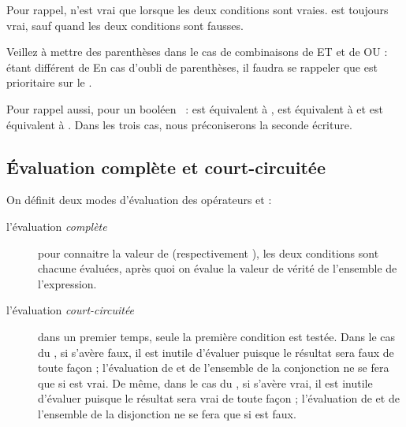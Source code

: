 			Pour rappel,  n’est vrai que lorsque
			les deux conditions sont vraies.  est
			toujours vrai, sauf quand les deux conditions sont fausses.
	
			Veillez à mettre des parenthèses dans le cas de combinaisons de ET et de
			OU :  étant différent de
			 En cas
			d'oubli de parenthèses, il faudra se rappeler que
			 est prioritaire sur le .
			
			Pour rappel aussi, pour un booléen ~: 
			 est équivalent à ,
			 est équivalent à  et 
			 est équivalent à .
			Dans les trois cas, nous préconiserons la seconde écriture.
	
		\subsection{Évaluation complète et court-circuitée}
	
			On définit deux modes d’évaluation des opérateurs 
			et  :
	
			\begin{description}
			\item[l’évaluation \textit{complète}]
				pour connaitre la valeur de
				 (respectivement
				), les deux conditions sont chacune
				évaluées, après quoi on évalue la valeur de vérité de l’ensemble de
				l'expression.
			\item[l’évaluation \textit{court-circuitée}]
				dans un premier temps, seule la
				première condition est testée. Dans le cas du ,
				si  s’avère faux, il est inutile d’évaluer
				 puisque le résultat sera faux de toute façon
				; l’évaluation de  et de l’ensemble de la
				conjonction ne se fera que si  est vrai. De
				même, dans le cas du , si
				 s’avère vrai, il est inutile d’évaluer
				 puisque le résultat sera vrai de toute façon
				; l’évaluation de  et de l’ensemble de la
				disjonction ne se fera que si  est faux.
			\end{description}
	
